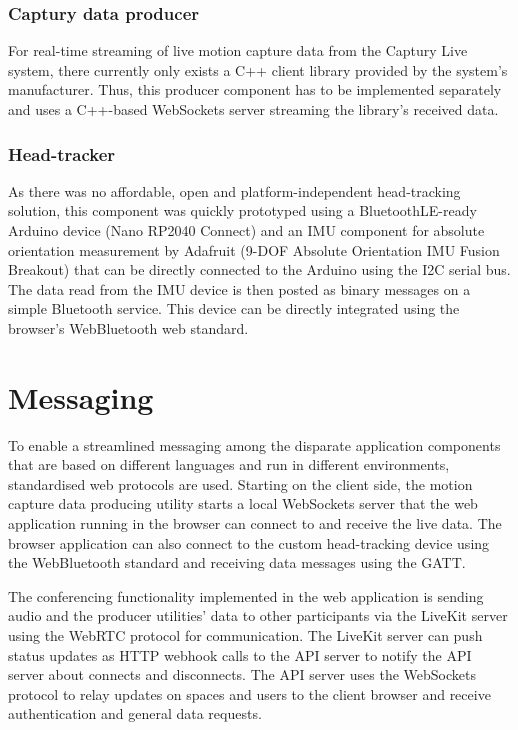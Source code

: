 \subsubsection{Captury data producer}

For real-time streaming of live motion capture data from the Captury Live system, there currently only exists a C++ client library provided by the system's manufacturer. Thus, this producer component has to be implemented separately and uses a C++-based WebSockets server streaming the library's received data.

\subsubsection{Head-tracker}

As there was no affordable, open and platform-independent head-tracking solution, this component was quickly prototyped using a BluetoothLE-ready Arduino device (Nano RP2040 Connect) and an \ac{IMU} component for absolute orientation measurement by Adafruit (9-DOF Absolute Orientation IMU Fusion Breakout) that can be directly connected to the Arduino using the \ac{I2C} serial bus. The data read from the \ac{IMU} device is then posted as binary messages on a simple Bluetooth service. This device can be directly integrated using the browser's WebBluetooth web standard.

\section{Messaging}

To enable a streamlined messaging among the disparate application components that are based on different languages and run in different environments, standardised web protocols are used. Starting on the client side, the motion capture data producing utility starts a local WebSockets server that the web application running in the browser can connect to and receive the live data. The browser application can also connect to the custom head-tracking device using the WebBluetooth standard and receiving data messages using the \ac{GATT}.

The conferencing functionality implemented in the web application is sending audio and the producer utilities' data to other participants via the LiveKit server using the WebRTC protocol for communication. The LiveKit server can push status updates as \ac{HTTP} webhook calls to the API server to notify the \ac{API} server about connects and disconnects. The \ac{API} server uses the WebSockets protocol to relay updates on spaces and users to the client browser and receive authentication and general data requests.

